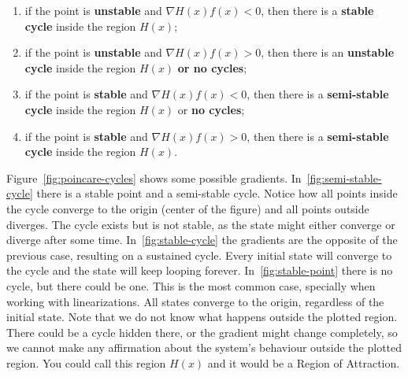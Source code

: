 \begin{enumerate}
  \item if the point is \textbf{unstable} and \(\nabla{}H(x)f(x) < 0\), then there is
        a \textbf{stable cycle} inside the region \(H(x)\);
  \item if the point is \textbf{unstable} and \(\nabla{}H(x)f(x) > 0\), then there is
        an \textbf{unstable cycle} inside the region \(H(x)\) \textbf{or no
          cycles};
  \item if the point is \textbf{stable} and \(\nabla{}H(x)f(x) < 0\), then there is a
        \textbf{semi-stable cycle} inside the region \(H(x)\) or \textbf{no
          cycles};
  \item if the point is \textbf{stable} and \(\nabla{}H(x)f(x) > 0\), then there is a
        \textbf{semi-stable cycle} inside the region \(H(x)\).
\end{enumerate}

Figure~\ref{fig:poincare-cycles} shows some possible gradients.
In~\ref{fig:semi-stable-cycle} there is a stable point and a semi-stable cycle.
Notice how all points inside the cycle converge to the origin (center of the
figure) and all points outside diverges. The cycle exists but is not stable, as
the state might either converge or diverge after some time.
In~\ref{fig:stable-cycle} the gradients are the opposite of the previous case,
resulting on a sustained cycle. Every initial state will converge to the cycle
and the state will keep looping forever. In~\ref{fig:stable-point} there is no
cycle, but there could be one. This is the most common case, specially when
working with linearizations. All states converge to the origin, regardless of
the initial state. Note that we do not know what happens outside the plotted
region. There could be a cycle hidden there, or the gradient might change
completely, so we cannot make any affirmation about the system's behaviour
outside the plotted region. You could call this region \(H(x)\) and it would be
a Region of Attraction.

